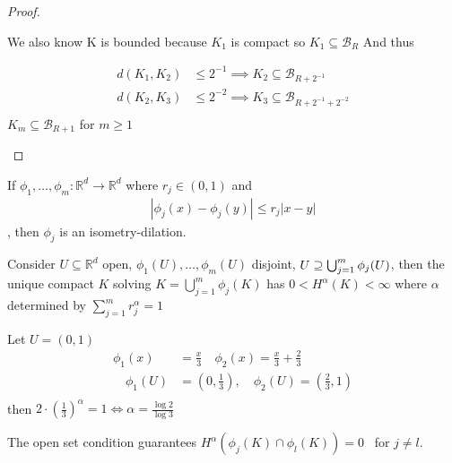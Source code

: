 \begin{proof}
\begin{subproof}
		We also know K is bounded because $K_1$ is compact so $K_{1} \subseteq \mathcal{B}_{R}$ And thus

		\begin{align*}
			d(K_1, K_2) &\leq 2^{-1} \implies K_{2} \subseteq \mathcal{B}_{R + 2^{-1}} \\
			d(K_2, K_3) &\leq 2^{-2} \implies K_{3} \subseteq \mathcal{B}_{R + 2^{-1} + 2^{-2}} \\
		\end{align*} 
		$K_{m} \subseteq \mathcal{B}_{R + 1}$ for $m \geq 1$
	\end{subproof}

\end{proof}

\begin{theorem}
		If $\phi_1, \ldots, \phi_m: \mathbb{R}^d \to \mathbb{R}^d$ where $r_j \in (0,1)$ and 
		\begin{align*}
			|\phi_j (x) - \phi_j (y) | \leq r_{j} |x - y|
		\end{align*},
		then $\phi_j$ is an isometry-dilation.

		Consider $U \subseteq \mathbb{R}^d$ open, $\phi_1 (U), \ldots , \phi_m(U)$ disjoint,
		$U \supseteq \bigcup_{j = 1}^{m} \phi_j (U)$, then the unique compact $K$ solving $K = \bigcup_{j = 1}^{m}\phi_j (K)$ has 
		$0 < H^{\alpha}(K) < \infty$ where $\alpha$ determined by 
		$\sum_{j=1}^{m} r_{j}^{\alpha} = 1$
\end{theorem}

\begin{example}
		Let $U = (0,1)$
		\begin{align*}
			\phi_1 (x) &= \frac{x}{3} \quad \phi_{2} (x) = \frac{x}{3} + \frac{2}{3} \\
			\quad \phi_1 (U) & = (0,\frac{1}{3} ), \quad \phi_2 (U) = (\frac{2}{3}, 1) \\
		\end{align*} 
		then $2 \cdot (\frac{1}{3})^{\alpha} = 1 \iff \alpha = \frac{\log 2}{\log 3}$ 

		The open set condition guarantees $H^{\alpha}( \phi_j (K) \cap \phi_l (K)) = 0$ \,
		for $j \neq l$.
\end{example}

